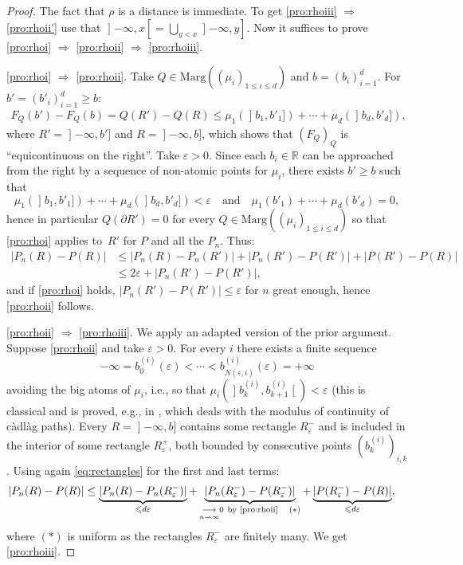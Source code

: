 \documentclass[11pt]{article}
\newcommand{\ie}{i.e.,\xspace}
\theoremstyle{plain}
\theoremstyle{definition}
\let\eps\varepsilon
\newcommand{\ma}{\mathrm{Marg}}
\newcommand{\R}{\mathbb{R}}
\newcommand{\AND}{\quad\text{and}\quad}
\newcommand{\op}{\mathopen}
\newcommand{\clo}{\mathclose}
\begin{document}
\begin{proof} The fact that $\rho$ is a distance is immediate. To get \eqref{pro:rhoiii} $\Rightarrow$ \eqref{pro:rhoii'} use that $\op]-\infty,x\clo[=\bigcup_{y<x}\op]-\infty,y]$. Now it suffices to prove \eqref{pro:rhoi} $\Rightarrow$ \eqref{pro:rhoii} $\Rightarrow$ \eqref{pro:rhoiii}.

\eqref{pro:rhoi} $\Rightarrow$ \eqref{pro:rhoii}. Take $Q\in\ma((\mu_i)_{1\leq i\leq d})$ and $b=(b_i)_{i=1}^d$. For $b'=(b'_i)_{i=1}^d\geq b$:
\begin{align}\label{eq:rectangles}
F_Q(b')-F_Q(b)=Q(R')-Q(R)\leq \mu_1(\op]b_1,b'_1])+\cdots+ \mu_d(\op]b_d,b'_d]),
\end{align}
where $R'=\op]-\infty,b']$ and $R=\op]-\infty,b]$, which shows that $(F_Q)_Q$ is ``equicontinuous on the right''. Take $\eps>0$. Since each $b_i\in \R$ can be approached from the right by a sequence of non-atomic points for $\mu_i$, there exists $b'\geqslant b$ such that
\[
\mu_1(\op]b_1,b'_1])+\cdots+ \mu_d(\op]b_d,b'_d])<\eps\AND \mu_1(b'_1)+\cdots+ \mu_d(b'_d)=0,
\]
hence in particular $Q(\partial R')=0$ for every $Q\in \ma((\mu_i)_{1\leq i\leq d})$ so that \eqref{pro:rhoi} applies to~$R'$ for $P$ and all the $P_n$. Thus:\vspace*{-3pt}
\begin{align*}
|P_n(R)- P(R)|&\leq|P_n(R)- P_n(R')|+|P_n(R')-P(R')|+|P(R')- P(R)|\\
&\leq 2\eps+|P_n(R')-P(R')|,
\end{align*}
and if \eqref{pro:rhoi} holds, $|P_n(R')-P(R')|\leqslant\eps$ for $n$ great enough, hence \eqref{pro:rhoii} follows.

\eqref{pro:rhoii} $\Rightarrow$ \eqref{pro:rhoiii}. We apply an adapted version of the prior argument. Suppose \eqref{pro:rhoii} and take $\eps>0$. For every $i$ there exists a finite sequence\vspace*{-3pt}
\[
-\infty=b_0^{(i)}(\eps)<\cdots< b^{(i)}_{N(\eps,i)}(\eps)=+\infty
\]
avoiding the big atoms of $\mu_i$, \ie so that $\mu_i(\op]b_k^{(i)},b_{k+1}^{(i)}\clo[)< \eps$ (this is classical and is proved, e.g., in \cite[\S 12]{Bi}, which deals with the modulus of continuity of càdlàg paths). Every $R=\op]-\infty,b]$ contains some rectangle $R^-_\eps$ and is included in the interior of some rectangle $R^+_\eps$, both bounded by consecutive points $(b^{(i)}_k)_{i,k}$. Using again \eqref{eq:rectangles} for the first and last terms:
\begin{align*}
|P_n(R)- P(R)|&\leq\underbrace{|P_n(R)- P_n(R_\eps^-)|}_{\leqslant d\eps}+\underbrace{|P_n(R_\eps^-)-P(R_\eps^-)|}_{\underset{n\to\infty}\longrightarrow0\ \text{by \eqref{pro:rhoii}}\quad\text{\bf$(\ast)$}}+\underbrace{|P(R_\eps^-)- P(R)|}_{\leqslant d\eps},
\end{align*}
where {\bf$(\ast)$} is uniform as the rectangles $R_\eps^-$ are finitely many. We get \eqref{pro:rhoiii}.
\end{proof}
\end{document}
